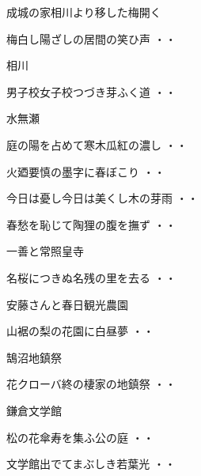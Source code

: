 \vspace{ 0.4cm}
成城の家相川より移した梅開く
\begin{shiika}梅白し陽ざしの居間の笑ひ声
\hfill{・・}\end{shiika}
\vspace{ 0.4cm}
相川
\begin{shiika}男子校女子校つづき芽ふく道
\hfill{・・}\end{shiika}
\vspace{ 0.4cm}
水無瀬
\begin{shiika}庭の陽を占めて寒木瓜紅の濃し
\hfill{・・}\end{shiika}
\begin{shiika}火廼要慎の墨字に春ぼこり
\hfill{・・}\end{shiika}
\begin{shiika}今日は憂し今日は美くし木の芽雨
\hfill{・・}\end{shiika}
\begin{shiika}春愁を恥じて陶狸の腹を撫ず
\hfill{・・}\end{shiika}
\vspace{ 0.4cm}
一善と常照皇寺
\begin{shiika}名桜につきぬ名残の里を去る
\hfill{・・}\end{shiika}
\vspace{ 0.4cm}
安藤さんと春日観光農園
\begin{shiika}山裾の梨の花園に白昼夢
\hfill{・・}\end{shiika}
\vspace{ 0.4cm}
鵠沼地鎮祭
\begin{shiika}花クローバ終の棲家の地鎮祭
\hfill{・・}\end{shiika}
\vspace{ 0.4cm}
鎌倉文学館
\begin{shiika}松の花傘寿を集ふ公の庭
\hfill{・・}\end{shiika}
\begin{shiika}文学館出でてまぶしき若葉光
\hfill{・・}\end{shiika}
\vspace{ 0.4cm}
